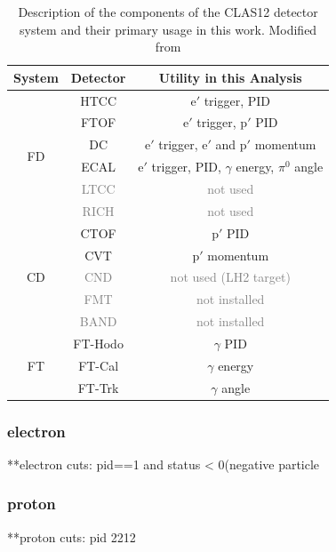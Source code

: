    \begin{table}[h]
        \centering
        \begin{tabular}{c|c|c}
            System & Detector  & Utility in this Analysis \\
            \hline
            \multirow{6}{*}{FD} & HTCC & $\mathrm{e'}$ trigger, PID \\
            & FTOF & $\mathrm{e'}$ trigger, $\mathrm{p'}$ PID \\
            & DC & $\mathrm{e'}$ trigger, $\mathrm{e'}$ and $\mathrm{p'}$ momentum \\
            & ECAL & $\mathrm{e'}$ trigger, PID, $\gamma$ energy, $\pi^0$ angle \\
            & \textcolor{gray}{LTCC} & \textcolor{gray}{not used} \\
            & \textcolor{gray}{RICH} & \textcolor{gray}{not used} \\
            \hline
            \multirow{5}{*}{CD} & CTOF & $\mathrm{p'}$ PID \\
            & CVT & $\mathrm{p'}$ momentum \\
            & \textcolor{gray}{CND} & \textcolor{gray}{not used (LH2 target)} \\
            & \textcolor{gray}{FMT} & \textcolor{gray}{not installed} \\
            & \textcolor{gray}{BAND} & \textcolor{gray}{not installed} \\
            \hline
            \multirow{3}{*}{FT} & FT-Hodo & $\gamma$ PID \\
            & FT-Cal & $\gamma$ energy \\
            & FT-Trk & $\gamma$ angle \\
        \end{tabular}
        \caption[CLAS12 Detectors Main Functions]{Description of the components of the CLAS12 detector system and their primary usage in this work. Modified from \parencite{Lee2022MeasurementDetector}}
        \label{tab:detector_components}
    \end{table}

    \subsubsection*{electron}
        **electron cuts: pid==1 and status < 0(negative particle

    
    \subsubsection*{proton}
        **proton cuts: pid 2212
        
